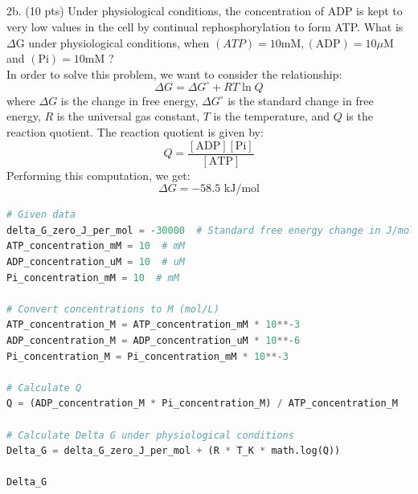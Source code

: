 \documentclass[12 pt]{article}
\begin{document}
\subsection{}
2b. (10 pts) Under physiological conditions, the concentration of ADP is kept to very low values in the cell by continual rephosphorylation to form ATP. What is $\Delta \mathrm{G}$ under physiological conditions, when $(A T P)=10 \mathrm{mM},(\mathrm{ADP})=10 \mu \mathrm{M}$ and $(\mathrm{Pi})=10 \mathrm{mM}$ ?\\
In order to solve this problem, we want to consider the relationship:
\begin{equation}
  \Delta G = \Delta G^\circ + RT \ln Q
\end{equation}
where $\Delta G$ is the change in free energy, $\Delta G^\circ$ is the standard change in free energy, $R$ is the universal gas constant, $T$ is the temperature, and $Q$ is the reaction quotient. The reaction quotient is given by:
\begin{equation}
  Q = \frac{[\text{ADP}] [\text{Pi}]}{[\text{ATP}]}
\end{equation}
Performing this computation, we get:
\begin{equation}
  \Delta G = -58.5 \text{ kJ/mol}
\end{equation}
\begin{lstlisting}[language=Python]
# Given data
delta_G_zero_J_per_mol = -30000  # Standard free energy change in J/mol
ATP_concentration_mM = 10  # mM
ADP_concentration_uM = 10  # uM
Pi_concentration_mM = 10  # mM

# Convert concentrations to M (mol/L)
ATP_concentration_M = ATP_concentration_mM * 10**-3
ADP_concentration_M = ADP_concentration_uM * 10**-6
Pi_concentration_M = Pi_concentration_mM * 10**-3

# Calculate Q
Q = (ADP_concentration_M * Pi_concentration_M) / ATP_concentration_M

# Calculate Delta G under physiological conditions
Delta_G = delta_G_zero_J_per_mol + (R * T_K * math.log(Q))

Delta_G

\end{lstlisting}
\end{document}
